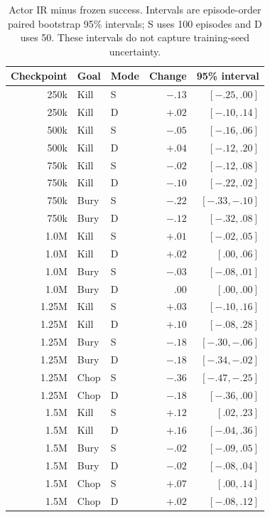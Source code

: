 \documentclass[10pt]{article}
\begin{document}
\begin{table}[H]
\centering
\small
\caption{Actor IR minus frozen success. Intervals are episode-order paired bootstrap 95\% intervals; S uses 100 episodes and D uses 50. These intervals do not capture training-seed uncertainty.}
\begin{tabular}{rllrr}
\toprule
Checkpoint & Goal & Mode & Change & 95\% interval \\
\midrule
250k & Kill & S & $-.13$ & $[-.25,.00]$ \\
250k & Kill & D & $+.02$ & $[-.10,.14]$ \\
500k & Kill & S & $-.05$ & $[-.16,.06]$ \\
500k & Kill & D & $+.04$ & $[-.12,.20]$ \\
750k & Kill & S & $-.02$ & $[-.12,.08]$ \\
750k & Kill & D & $-.10$ & $[-.22,.02]$ \\
750k & Bury & S & $-.22$ & $[-.33,-.10]$ \\
750k & Bury & D & $-.12$ & $[-.32,.08]$ \\
1.0M & Kill & S & $+.01$ & $[-.02,.05]$ \\
1.0M & Kill & D & $+.02$ & $[.00,.06]$ \\
1.0M & Bury & S & $-.03$ & $[-.08,.01]$ \\
1.0M & Bury & D & $.00$ & $[.00,.00]$ \\
1.25M & Kill & S & $+.03$ & $[-.10,.16]$ \\
1.25M & Kill & D & $+.10$ & $[-.08,.28]$ \\
1.25M & Bury & S & $-.18$ & $[-.30,-.06]$ \\
1.25M & Bury & D & $-.18$ & $[-.34,-.02]$ \\
1.25M & Chop & S & $-.36$ & $[-.47,-.25]$ \\
1.25M & Chop & D & $-.18$ & $[-.36,.00]$ \\
1.5M & Kill & S & $+.12$ & $[.02,.23]$ \\
1.5M & Kill & D & $+.16$ & $[-.04,.36]$ \\
1.5M & Bury & S & $-.02$ & $[-.09,.05]$ \\
1.5M & Bury & D & $-.02$ & $[-.08,.04]$ \\
1.5M & Chop & S & $+.07$ & $[.00,.14]$ \\
1.5M & Chop & D & $+.02$ & $[-.08,.12]$ \\
\bottomrule
\end{tabular}
\end{table}
\end{document}
